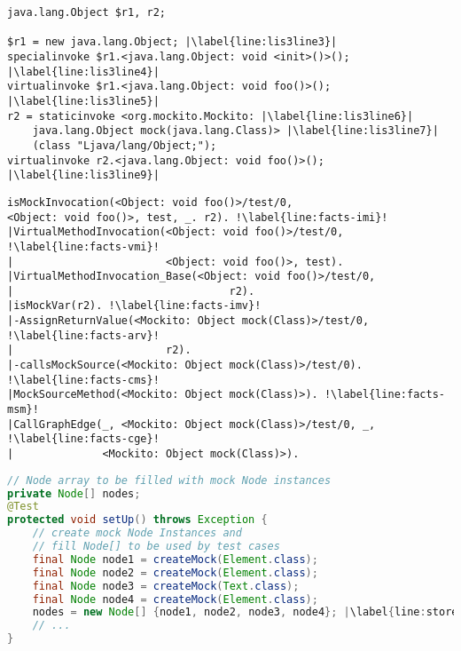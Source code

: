 \begin{lstlisting}[basicstyle=\ttfamily, caption={Jimple Intermediate Representation for the code in Figure~\ref{fig:mockMethodIllustration}.},
basicstyle=\scriptsize\ttfamily, captionpos=b, label=lis:mockMethodIllustrationIR, escapechar=|, morekeywords={@Test, specialinvoke, virtualinvoke, staticinvoke}]
java.lang.Object $r1, r2;

$r1 = new java.lang.Object; |\label{line:lis3line3}|
specialinvoke $r1.<java.lang.Object: void <init>()>(); |\label{line:lis3line4}|
virtualinvoke $r1.<java.lang.Object: void foo()>(); |\label{line:lis3line5}|
r2 = staticinvoke <org.mockito.Mockito: |\label{line:lis3line6}|
	java.lang.Object mock(java.lang.Class)> |\label{line:lis3line7}|
	(class "Ljava/lang/Object;");
virtualinvoke r2.<java.lang.Object: void foo()>(); |\label{line:lis3line9}|
\end{lstlisting}


\begin{lstlisting}[basicstyle=\ttfamily, caption={Facts about invocation \texttt{r2.foo()} in method \texttt{test}.},
basicstyle=\scriptsize\ttfamily, framesep=4.5mm, framexleftmargin=1.0mm, captionpos=b, label=lis:facts, escapechar=!, morekeywords={@Test}]
isMockInvocation(<Object: void foo()>/test/0, 
<Object: void foo()>, test, _. r2). !\label{line:facts-imi}!
|VirtualMethodInvocation(<Object: void foo()>/test/0, !\label{line:facts-vmi}!
|                        <Object: void foo()>, test).
|VirtualMethodInvocation_Base(<Object: void foo()>/test/0, 
|                                  r2).
|isMockVar(r2). !\label{line:facts-imv}!
|-AssignReturnValue(<Mockito: Object mock(Class)>/test/0, !\label{line:facts-arv}!
|                        r2). 
|-callsMockSource(<Mockito: Object mock(Class)>/test/0). !\label{line:facts-cms}!
|MockSourceMethod(<Mockito: Object mock(Class)>). !\label{line:facts-msm}!
|CallGraphEdge(_, <Mockito: Object mock(Class)>/test/0, _, !\label{line:facts-cge}!
|              <Mockito: Object mock(Class)>). 
\end{lstlisting}


\begin{lstlisting}[basicstyle=\ttfamily, caption={This example illustrates a field array container holding mock objects from \textit{setup()} in \texttt{NodeListIteratorTest.java}.},
basicstyle=\scriptsize\ttfamily,language = Java, framesep=4.5mm, framexleftmargin=1.0mm, captionpos=b, label=lis:container, escapechar=|, morekeywords={@Test}]
// Node array to be filled with mock Node instances
private Node[] nodes;
@Test
protected void setUp() throws Exception {
	// create mock Node Instances and 
	// fill Node[] to be used by test cases
	final Node node1 = createMock(Element.class);
	final Node node2 = createMock(Element.class);
	final Node node3 = createMock(Text.class);
	final Node node4 = createMock(Element.class);
	nodes = new Node[] {node1, node2, node3, node4}; |\label{line:storeMocksInArray}|
	// ...
}
\end{lstlisting}


